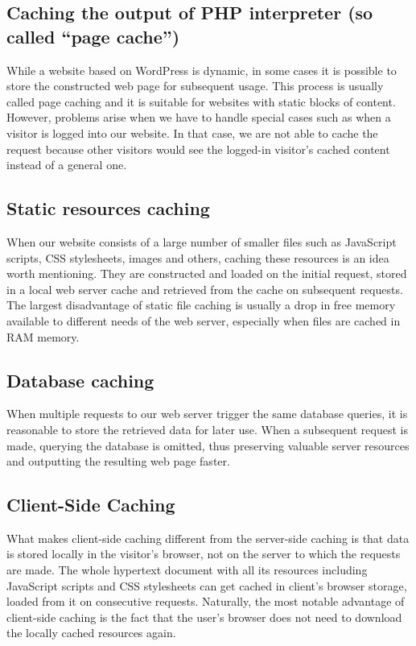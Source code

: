 \subsection*{Caching the output of PHP interpreter (so called “page cache”)}

While a website based on WordPress is dynamic, in some cases it is possible to store the constructed web page for subsequent usage. This process is usually called page caching and it is suitable for websites with static blocks of content. However, problems arise when we have to handle special cases such as when a visitor is logged into our website. In that case, we are not able to cache the request because other visitors would see the logged-in visitor’s cached content instead of a general one.

\subsection*{Static resources caching}

When our website consists of a large number of smaller files such as JavaScript scripts, CSS stylesheets, images and others, caching these resources is an idea worth mentioning. They are constructed and loaded on the initial request, stored in a local web server cache and retrieved from the cache on subsequent requests.\\ 

The largest disadvantage of static file caching is usually a drop in free memory available to different needs of the web server, especially when files are cached in RAM memory.

\subsection*{Database caching}

When multiple requests to our web server trigger the same database queries, it is reasonable to store the retrieved data for later use. When a subsequent request is made, querying the database is omitted, thus preserving valuable server resources and outputting the resulting web page faster.

\subsection{Client-Side Caching}

What makes client-side caching different from the server-side caching is that data is stored locally in the visitor’s browser, not on the server to which the requests are made. \cite{Study:Mnot-caching} The whole hypertext document with all its resources including JavaScript scripts and CSS stylesheets can get cached in client's browser storage, loaded from it on consecutive requests. Naturally, the most notable advantage of client-side caching is the fact that the user’s browser does not need to download the locally cached resources again. \\

